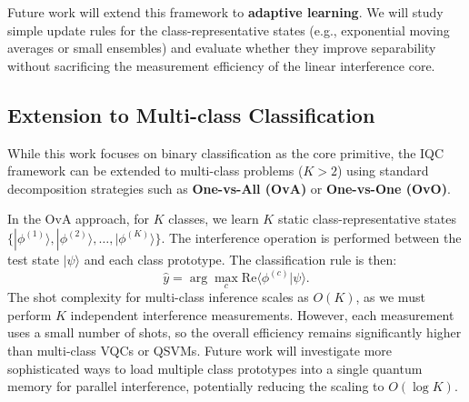 \documentclass[conference]{IEEEtran}
\begin{document}
Future work will extend this framework to \textbf{adaptive learning}. We will study simple update rules for the class-representative states (e.g., exponential moving averages or small ensembles) and evaluate whether they improve separability without sacrificing the measurement efficiency of the linear interference core.

\subsection{Extension to Multi-class Classification}
While this work focuses on binary classification as the core primitive, the IQC framework can be extended to multi-class problems ($K > 2$) using standard decomposition strategies such as \textbf{One-vs-All (OvA)} or \textbf{One-vs-One (OvO)}.

In the OvA approach, for $K$ classes, we learn $K$ static class-representative states $\{|\phi^{(1)}\rangle, |\phi^{(2)}\rangle, \dots, |\phi^{(K)}\rangle\}$. The interference operation is performed between the test state $|\psi\rangle$ and each class prototype. The classification rule is then:
\begin{equation}
    \hat{y} = \arg\max_c \mathrm{Re}\langle \phi^{(c)} | \psi \rangle.
\end{equation}
The shot complexity for multi-class inference scales as $O(K)$, as we must perform $K$ independent interference measurements. However, each measurement uses a small number of shots, so the overall efficiency remains significantly higher than multi-class VQCs or QSVMs. Future work will investigate more sophisticated ways to load multiple class prototypes into a single quantum memory for parallel interference, potentially reducing the scaling to $O(\log K)$.
\end{document}
